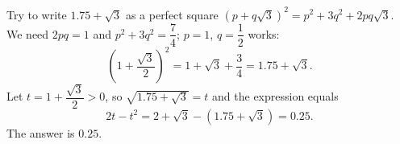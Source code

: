 Try to write $1.75+\sqrt3$ as a perfect square $(p+q\sqrt3)^2=p^2+3q^2+2pq\sqrt3$. We need $2pq=1$ and $p^2+3q^2=\dfrac{7}{4}$; $p=1$, $q=\dfrac{1}{2}$ works:
\[
\left(1+\dfrac{\sqrt3}{2}\right)^2=1+\sqrt3+\dfrac{3}{4}=1.75+\sqrt3 .
\]
Let $t=1+\dfrac{\sqrt3}{2}>0$, so $\sqrt{1.75+\sqrt3}=t$ and the expression equals
\[
2t-t^2=2+\sqrt3-\left(1.75+\sqrt3\right)=0.25 .
\]
The answer is $\boxed{0.25}$.
